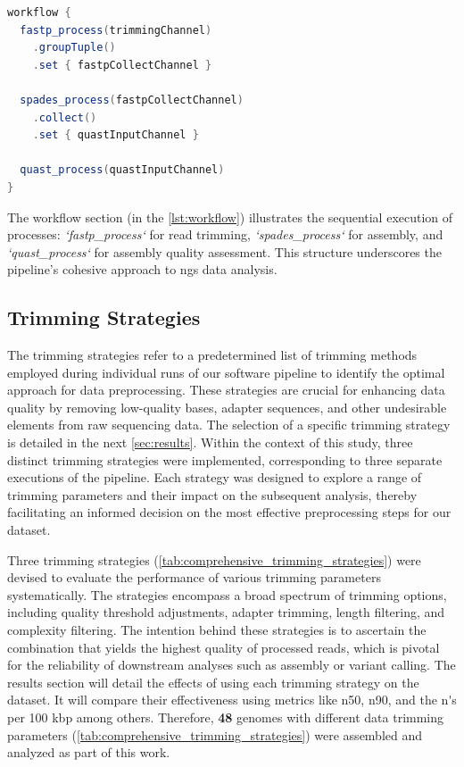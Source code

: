 \begin{lstlisting}[language=Java, label={lst:workflow}, caption={The Workflow Section}]
workflow {
  fastp_process(trimmingChannel)
    .groupTuple()
    .set { fastpCollectChannel }

  spades_process(fastpCollectChannel)
    .collect()
    .set { quastInputChannel }

  quast_process(quastInputChannel)
}
\end{lstlisting}

The workflow section (in the \autoref{lst:workflow}) illustrates the sequential execution of processes: \textit{`fastp\_process`} for \gls{read} \gls{trimming}, \textit{`spades\_process`} for \gls{assembly}, and \textit{`quast\_process`} for assembly quality assessment. This structure underscores the pipeline's cohesive approach to \gls{ngs} data analysis.

\subsection{Trimming Strategies}


The \gls{trimming} strategies refer to a predetermined list of \gls{trimming} methods employed during individual runs of our software pipeline to identify the optimal approach for data preprocessing. These strategies are crucial for enhancing data quality by removing low-quality bases, adapter sequences, and other undesirable elements from raw \gls{sequencing} data. The selection of a specific \gls{trimming} strategy is detailed in the next \autoref{sec:results}. Within the context of this study, three distinct \gls{trimming} strategies were implemented, corresponding to three separate executions of the pipeline. Each strategy was designed to explore a range of \gls{trimming} parameters and their impact on the subsequent analysis, thereby facilitating an informed decision on the most effective preprocessing steps for our dataset.


Three \gls{trimming} strategies (\autoref{tab:comprehensive_trimming_strategies}) were devised to evaluate the performance of various \gls{trimming} parameters systematically. The strategies encompass a broad spectrum of \gls{trimming} options, including quality threshold adjustments, adapter trimming, length filtering, and complexity filtering. The intention behind these strategies is to ascertain the combination that yields the highest quality of processed \gls{read}s, which is pivotal for the reliability of downstream analyses such as \gls{assembly} or variant calling. The results section will detail the effects of using each \gls{trimming} strategy on the dataset. It will compare their effectiveness using metrics like \gls{n50}, \gls{n90}, and the  \gls{n's per 100 kbp} among others. Therefore, \textbf{48} \gls{genome}s with different data \gls{trimming} parameters (\autoref{tab:comprehensive_trimming_strategies}) were assembled and analyzed as part of this work. 

